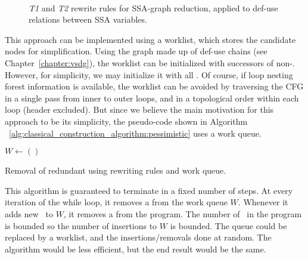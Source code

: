 {\begin{figure}
  
  ~\vspace{2em}
  
  \caption{\label{fig:t1t2transforms}\emph{T1} and \emph{T2} rewrite rules for SSA-graph reduction, applied to def-use relations between SSA variables.}
\end{figure}

This approach can be implemented using a worklist, which stores the candidate nodes for simplification. 
Using the graph made up of def-use chains (see Chapter~\ref{chapter:vsdg}), the worklist can be initialized with successors of non-\phifuns. 
However, for simplicity, we may initialize it with all \phifuns. 
Of course, if loop nesting forest information is available, the worklist can be avoided by traversing the CFG in a single pass from inner to outer loops, and in a topological order within each loop (header excluded). 
But since we believe the main motivation for this approach to be its simplicity, the pseudo-code shown in Algorithm ~\ref{alg:classical_construction_algorithm:pessimistic} uses a work queue.


\begin{algorithm}[h]
$W \leftarrow ()$ \;
\caption{\label{alg:classical_construction_algorithm:pessimistic}
Removal of redundant \phifuns using rewriting rules and work queue.}
\end{algorithm}

This algorithm is guaranteed to terminate in a fixed number of steps. 
At every iteration of the while loop, it removes a \phifun from the work queue $W$. 
Whenever it adds new \phifuns\ to $W$, it removes a \phifun from the program. 
The number of \phifuns\ in the program is bounded so the number of insertions to $W$ is bounded. 
The queue could be replaced by a worklist, and the insertions/removals done at random. 
The algorithm would be less efficient, but the end result would be the same.

}
